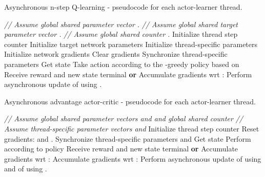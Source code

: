 \documentclass{article} \usepackage{times}
\begin{document}
 
\begin{algorithm}[h]
\caption{Asynchronous n-step Q-learning - pseudocode for each actor-learner thread.}
\begin{algorithmic}
\small
\State \emph{// Assume global shared parameter vector .}
\State \emph{// Assume global shared target parameter vector .}
\State \emph{// Assume global shared counter .}
\State Initialize thread step counter 
\State Initialize target network parameters 
\State Initialize thread-specific parameters 
\State Initialize network gradients 
\Repeat
\State Clear gradients 
\State Synchronize thread-specific parameters 
\State 
\State Get state 
\Repeat
\State Take action  according to the -greedy policy based on 
\State Receive reward  and new state 
\State 
\State 
\Until terminal  \textbf{or} 
\State 
\For {}
\State 
\State Accumulate gradients wrt : 
\EndFor
\State Perform asynchronous update of  using .
\If {}
\State 
\EndIf
\Until 
\end{algorithmic}
\label{alg:msq}
\end{algorithm}

\begin{algorithm}[h]
\caption{Asynchronous advantage actor-critic - pseudocode for each actor-learner thread.}
\begin{algorithmic}
\small
\State \emph{// Assume global shared parameter vectors  and  and global shared counter }
\State \emph{// Assume thread-specific parameter vectors  and }
\State Initialize thread step counter 
\Repeat
\State Reset gradients:  and .
\State Synchronize thread-specific parameters   and  \State 
\State Get state 
\Repeat
\State Perform  according to policy 
\State Receive reward  and new state 
\State 
\State 
\Until terminal  \textbf{or} 
\State 
\For {}
\State 
\State Accumulate gradients wrt : 
\State Accumulate gradients wrt : 
\EndFor
\State Perform asynchronous update of  using  and of  using .
\Until 
\end{algorithmic}
\label{alg:reinforce}
\end{algorithm}

\clearpage

\clearpage
\end{document}

